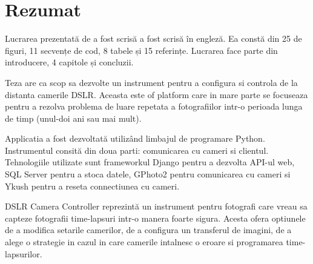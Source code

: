 \section*{Rezumat}

Lucrarea \textbf{\ThesisTitle} prezentată de \MyName a fost scrisă a fost scrisă în engleză. Ea constă din 25 de figuri, 11 secvențe de cod, 8 tabele și 15 referințe. Lucrarea face parte din introducere, 4 capitole și concluzii.

Teza are ca scop sa dezvolte un instrument pentru a configura si controla de la distanta camerile DSLR. Aceasta este of platform care in mare parte se focuseaza pentru a rezolva problema de luare repetata a fotografiilor intr-o perioada lunga de timp (unul-doi ani sau mai mult).

Applicatia a fost dezvoltată utilizând limbajul de programare Python. Instrumentul consită din doua parti: comunicarea cu cameri si clientul. Tehnologiile utilizate sunt frameworkul Django pentru a dezvolta API-ul web, SQL Server pentru a stoca datele, GPhoto2 pentru comunicarea cu cameri si Ykush pentru a reseta connectiunea cu cameri.

DSLR Camera Controller reprezintă un instrument pentru fotografi care vreau sa capteze fotografii time-lapsuri intr-o manera foarte sigura. Acesta ofera optiunele de a modifica setarile camerilor, de a configura un transferul de imagini, de a alege o strategie in cazul in care camerile intalnesc o eroare si programarea time-lapsurilor.